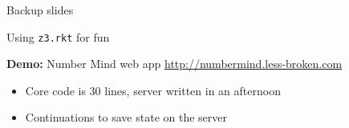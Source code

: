 \documentclass{beamer}
\begin{document}
\begin{frame}
Backup slides
\end{frame}

\begin{frame}{Using \texttt{z3.rkt} for fun}
\begin{center}
\textbf{Demo:} Number Mind web app \url{http://numbermind.less-broken.com}
\end{center}
\pause
\begin{itemize}
\item Core code is 30 lines, server written in an afternoon
\item Continuations to save state on the server
\end{itemize}
\end{frame}
\end{document}

